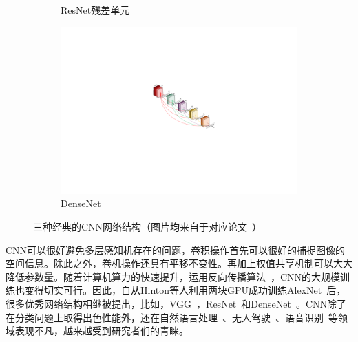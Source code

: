 \begin{figure}[h!]
\begin{subfigure}{0.336\textwidth}
		\caption{ResNet残差单元~\cite{he2016deep}}
		\label{subfig:resnet_block}
	\end{subfigure}
	\begin{subfigure}{0.265\textwidth}
		\centering
		\includegraphics[width=1.0\textwidth]{figure/popular_networks_densenet}
		\caption{DenseNet~\cite{huang2017densely}}
	\end{subfigure}
	\caption{三种经典的CNN网络结构（图片均来自于对应论文~\cite{krizhevsky2012imagenet, he2016deep, huang2017densely}）} 
	\label{mulfig:popular_networks}
\end{figure}


CNN可以很好避免多层感知机存在的问题，卷积操作首先可以很好的捕捉图像的空间信息。除此之外，卷机操作还具有平移不变性。再加上权值共享机制可以大大降低参数量。随着计算机算力的快速提升，运用反向传播算法~\cite{hecht1992theory}，CNN的大规模训练也变得切实可行。因此，自从Hinton等人利用两块GPU成功训练AlexNet~\cite{krizhevsky2012imagenet}后，很多优秀网络结构相继被提出，比如，VGG~\cite{simonyan2014very}，ResNet~\cite{he2016deep, he2016identity}和DenseNet~\cite{huang2017densely}。CNN除了在分类问题上取得出色性能外，还在自然语言处理~\cite{dos2014deep, mou2016Convolutional}、无人驾驶~\cite{lee2017deep}、语音识别~\cite{abdel2013exploring}等领域表现不凡，越来越受到研究者们的青睐。

